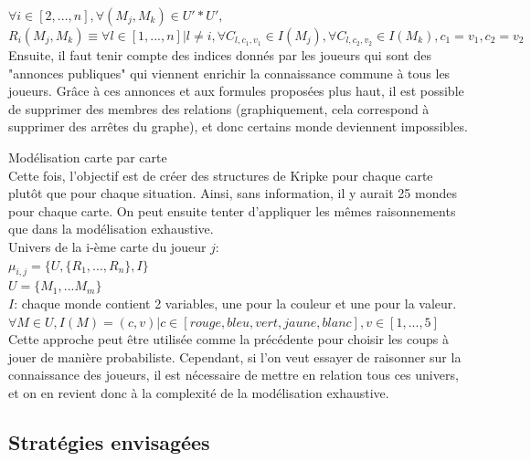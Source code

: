 \documentclass[11pt, letterpaper]{article}
\begin{document}
$   \forall i \in [2,...,n] ,  \forall (M_{j},M_{k}) \in U'*U',$\\

$R_{i}(M_{j},M_{k}) 
\equiv
\forall l \in [1,...,n]|l \ne i,  \forall C_{l,c_1,v_1} \in  I(M_{j}), \forall C_{l,c_2,v_2} \in  I(M_{k}), c_1=v_1, c_2=v_2    $\\

\noindent
Ensuite, il faut tenir compte des indices donnés par les joueurs qui sont des "annonces publiques" qui viennent enrichir la connaissance commune à tous les joueurs. Grâce à ces annonces et aux formules proposées plus haut, il est possible de supprimer des membres des relations (graphiquement, cela correspond à supprimer des arrêtes du graphe), et donc certains monde deviennent impossibles.

\noindent Modélisation carte par carte\\

\noindent
Cette fois, l'objectif est de créer des structures de Kripke pour chaque carte plutôt que pour chaque situation. Ainsi, sans information, il y aurait 25 mondes pour chaque carte. On peut ensuite tenter d'appliquer les mêmes raisonnements que dans la modélisation exhaustive.\\

Univers de la i-ème carte du joueur $j$:\\

$   \mu_{i,j}=\{U,\{R_{1},...,R_{n}\},I \}  $\\

$   U=\{M_{1},...M_{m} \}   $\\

$I$: chaque monde contient 2 variables, une pour la couleur et une pour la valeur. \\

$\forall M \in U, I(M)=(c,v)|c\in[rouge,bleu,vert,jaune,blanc],v\in[1,...,5]$\\

\noindent
Cette approche peut être utilisée comme la précédente pour choisir les coups à jouer de manière probabiliste. Cependant, si l'on veut essayer de raisonner sur la connaissance des joueurs, il est nécessaire de mettre en relation tous ces univers, et on en revient donc à la complexité de la modélisation exhaustive.

\subsection{Stratégies envisagées}
\end{document}
